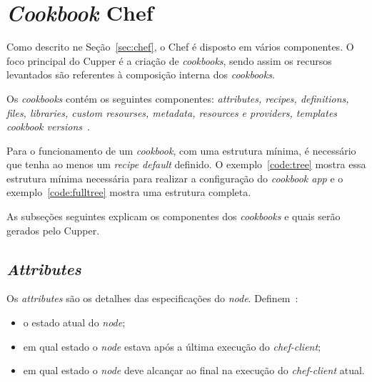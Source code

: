 \section{\textit{Cookbook} Chef}
\label{sec:lev-rec}

Como descrito ne Seção~\ref{sec:chef}, o Chef é disposto em vários
componentes. O foco principal do Cupper é a criação de \textit{cookbooks},
sendo assim os recursos levantados são referentes à composição interna
dos \textit{cookbooks}.

Os \textit{cookbooks} contém os seguintes componentes: \textit{attributes, recipes, definitions,
files, libraries, custom resourses, metadata, resources e providers, templates
cookbook versions}~\cite{chefdoc:2016}.

Para o funcionamento de um \textit{cookbook}, com uma estrutura mínima, é necessário que tenha
ao menos um \textit{recipe default} definido. O exemplo~\ref{code:tree} mostra essa
estrutura mínima necessária para realizar a configuração do \textit{cookbook app} e o exemplo~\ref{code:fulltree} mostra uma estrutura completa.

\noindent\begin{minipage}{.45\textwidth}
  
\end{minipage}\hfill
\noindent\begin{minipage}{.45\textwidth}
  
\end{minipage}

As subseções seguintes explicam os componentes dos \textit{cookbooks} e quais serão gerados
pelo Cupper.

\subsection{\textit{Attributes}}
\label{sec:lev-rec-att}

Os \textit{attributes} são os detalhes das especificações do \textit{node}. Definem~\cite{chefdoc:2016}:

\begin{itemize}
  \item o estado atual do \textit{node};
  \item em qual estado o \textit{node} estava após a última execução do \textit{chef-client};
  \item em qual estado o \textit{node} deve alcançar ao final na execução do \textit{chef-client} atual.
\end{itemize}


